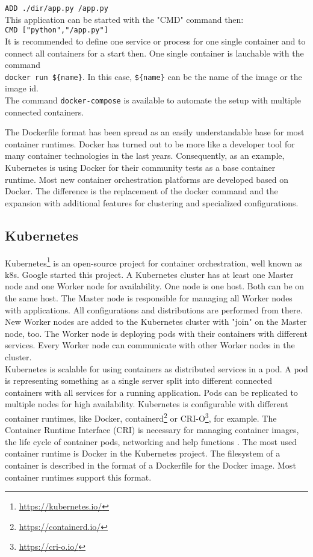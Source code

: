 \lstinline!ADD ./dir/app.py /app.py! \\
This application can be started with the "CMD" command then: \\
\lstinline!CMD ["python","/app.py"]! \\
It is recommended to define one service or process for one single container and to connect all containers for a start then. One single container is lauchable with the command \\
\lstinline!docker run ${name}!. In this case, \lstinline!${name}! can be the name of the image or the image id. \\
The command \lstinline!docker-compose! is available to automate the setup with multiple connected containers. 

The Dockerfile format has been spread as an easily understandable base for most container runtimes. 
Docker has turned out to be more like a developer tool for many container technologies in the last years. 
Consequently, as an example, Kubernetes is using Docker for their community tests as a base container runtime.
Most new container orchestration platforms are developed based on Docker. The difference is the replacement of the docker command and the expansion with additional features for clustering and specialized configurations.

\subsection{Kubernetes}

Kubernetes\footnote{\url{https://kubernetes.io/}} is an open-source project for container orchestration, well known as k8s. Google started this project. A Kubernetes cluster has at least one Master node and one Worker node for availability. One node is one host. Both can be on the same host. The Master node is responsible for managing all Worker nodes with applications. All configurations and distributions are performed from there. New Worker nodes are added to the Kubernetes cluster with "join" on the Master node, too. The Worker node is deploying pods with their containers with different services. Every Worker node can communicate with other Worker nodes in the cluster. \\
Kubernetes is scalable for using containers as distributed services in a pod. A pod is representing something as a single server split into different connected containers with all services for a running application. Pods can be replicated to multiple nodes for high availability. Kubernetes is configurable with different container runtimes, like Docker, containerd\footnote{\url{https://containerd.io/}} or CRI-O\footnote{\url{https://cri-o.io/}}, for example. The Container Runtime Interface (CRI) is necessary for managing container images, the life cycle of container pods, networking and help functions \cite[~p.16]{Scholl2019}. The most used container runtime is Docker in the Kubernetes project. The filesystem of a container is described in the format of a Dockerfile for the Docker image. Most container runtimes support this format.


